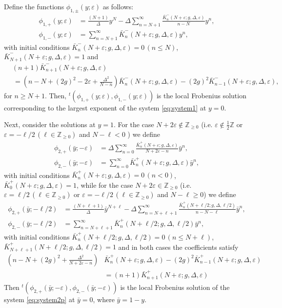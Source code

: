 \documentclass[11pt]{article}
\numberwithin{equation}{section}
\newcommand{\Z}{\mathbb{Z}} %
\newcommand{\e}{\varepsilon}
\theoremstyle{plain}
\theoremstyle{definition}
\theoremstyle{remark}
\begin{document}
Define the functions \(\phi_{1,\pm}(y;\e)\) as follows:
\begin{align}
  \phi_{1,+}(y;\e)&=\frac{(N+1)}{\Delta} y^N - \Delta \sum_{n=N+1}^{\infty} \frac{\bar{K}^-_n(N+\e;g,\Delta,\e)}{n-N} y^n, \label{eq:solphi1+} \\
  \phi_{1,-}(y;\e)&=\sum_{n=N+1}^{\infty} \bar{K}^-_n(N+\e;g,\Delta,\e) y^n, \label{eq:solphi1-}
\end{align}
with initial conditions \(\bar{K}^-_n(N+\e;g,\Delta,\e) = 0 \, (n \leq N)\), \(\bar{K}^-_{N+1}(N+\e;g,\Delta,\e) = 1\) and
\begin{align*}
  &(n+1) \bar{K}^-_{n+1}(N+\e;g,\Delta,\e) \\
  &\, =  \left(n - N + (2g)^2 - 2\e + \frac{\Delta^2}{N-n}   \right) \bar{K}^-_{n}(N+\e;g,\Delta,\e) - (2g)^2 \bar{K}^-_{n-1}(N+\e;g,\Delta,\e),
\end{align*}
for \(n \geq N+1\). Then,  ${}^t(\phi_{1,+}(y;\e),\phi_{1,-}(y;\e))$ is the local Frobenius solution corresponding to the
largest exponent of the system \eqref{eq:system1} at $y=0$.

Next, consider the solutions at $y=1$. For the case \(N + 2 \e \not\in \Z_{\geq 0} \) (i.e. \(\e \not\in \frac12 \Z\)
or \( \e = -\ell/2 \, (\ell \in \Z_{\geq 0})\) and \(N - \ell < 0 \) ) we define
\begin{align}
  \phi_{2,+}(\bar{y};-\e)&= \Delta\sum_{n = 0}^{\infty} \frac{\bar{K}_n^+(N+\e;g,\Delta,\e) }{N+2\e-n}\bar{y}^n, \\
  \phi_{2,-}(\bar{y};-\e)& = \sum_{n= 0}^{\infty} \bar{K}_n^+(N+\e;g,\Delta,\e) \bar{y}^n,
\end{align}
with initial conditions \(\bar{K}^+_n(N+\e;g,\Delta,\e) = 0\,(n<0)\), \(\bar{K}^+_0(N+\e;g,\Delta,\e) = 1\), while for the case  \(N + 2 \e \in \Z_{\geq 0} \) (i.e.
\(\e = \ell/2 \, (\ell \in \Z_{\geq 0})\) or \(\e = -\ell/2 \, (\ell \in \Z_{\geq 0})\) and \(N - \ell \geq 0 \)) we define
\begin{align}
  \phi_{2,+}(\bar{y};-\ell/2)&= \frac{(N+\ell+1)}{\Delta} \bar{y}^{N+\ell}  - \Delta\sum_{n=N+\ell + 1}^{\infty}
                        \frac{\bar{K}_n^+(N+\ell/2;g,\Delta,\ell/2)}{n-N-\ell} \bar{y}^n, \\
  \phi_{2,-}(\bar{y};-\ell/2)& = \sum_{n=N+\ell + 1}^{\infty} \bar{K}^+_n(N+\ell/2;g,\Delta,\ell/2) \bar{y}^n,
\end{align}
with initial conditions \(\bar{K}^+_{n}(N+\ell/2;g,\Delta,\ell/2) = 0 \, (n \leq N + \ell) \), \(\bar{K}^+_{N+\ell+1}(N+\ell/2;g,\Delta,\ell/2) = 1\)
and in both cases the coefficients satisfy
\begin{align*}
  \left(n - N + (2g)^2 + \frac{\Delta^2}{N+2\e-n}   \right)& \bar{K}^+_{n}(N+\e;g,\Delta,\e) - (2g)^2 \bar{K}^+_{n-1}(N+\e;g,\Delta,\e) \\
   &= (n+1) \bar{K}^+_{n+1}(N+\e;g,\Delta,\e) 
\end{align*}
Then ${}^t(\phi_{2,+}(\bar{y};-\e),\phi_{2,-}(\bar{y};-\e))$ is the local Frobenius solution of the system \eqref{eq:system2p}
at $\bar{y}=0$, where $\bar{y}=1-y$.
\end{document}
